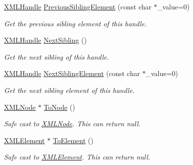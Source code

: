 \begin{DoxyCompactItemize}
\hyperlink{classtinyxml2_1_1XMLHandle}{X\+M\+L\+Handle} \hyperlink{classtinyxml2_1_1XMLHandle_a31a0d5d060292bec5df2b2efe2eca228}{Previous\+Sibling\+Element} (const char $\ast$\+\_\+value=0)
\begin{DoxyCompactList}\small\item\em Get the previous sibling element of this handle. \end{DoxyCompactList}\item 
\mbox{\label{classtinyxml2_1_1XMLHandle_aad2eccc7c7c7b18145877c978c3850b5}} 
\hyperlink{classtinyxml2_1_1XMLHandle}{X\+M\+L\+Handle} \hyperlink{classtinyxml2_1_1XMLHandle_aad2eccc7c7c7b18145877c978c3850b5}{Next\+Sibling} ()
\begin{DoxyCompactList}\small\item\em Get the next sibling of this handle. \end{DoxyCompactList}\item 
\mbox{\label{classtinyxml2_1_1XMLHandle_a447c9b284cfcd5518f9e320ba14b9c46}} 
\hyperlink{classtinyxml2_1_1XMLHandle}{X\+M\+L\+Handle} \hyperlink{classtinyxml2_1_1XMLHandle_a447c9b284cfcd5518f9e320ba14b9c46}{Next\+Sibling\+Element} (const char $\ast$\+\_\+value=0)
\begin{DoxyCompactList}\small\item\em Get the next sibling element of this handle. \end{DoxyCompactList}\item 
\mbox{\label{classtinyxml2_1_1XMLHandle_a03ea6ec970a021b71bf1219a0f6717df}} 
\hyperlink{classtinyxml2_1_1XMLNode}{X\+M\+L\+Node} $\ast$ \hyperlink{classtinyxml2_1_1XMLHandle_a03ea6ec970a021b71bf1219a0f6717df}{To\+Node} ()
\begin{DoxyCompactList}\small\item\em Safe cast to \hyperlink{classtinyxml2_1_1XMLNode}{X\+M\+L\+Node}. This can return null. \end{DoxyCompactList}\item 
\mbox{\label{classtinyxml2_1_1XMLHandle_a5e73ed8f3f6f9619d5a8bb1862c47d99}} 
\hyperlink{classtinyxml2_1_1XMLElement}{X\+M\+L\+Element} $\ast$ \hyperlink{classtinyxml2_1_1XMLHandle_a5e73ed8f3f6f9619d5a8bb1862c47d99}{To\+Element} ()
\begin{DoxyCompactList}\small\item\em Safe cast to \hyperlink{classtinyxml2_1_1XMLElement}{X\+M\+L\+Element}. This can return null. \end{DoxyCompactList}\item 

\end{DoxyCompactItemize}
